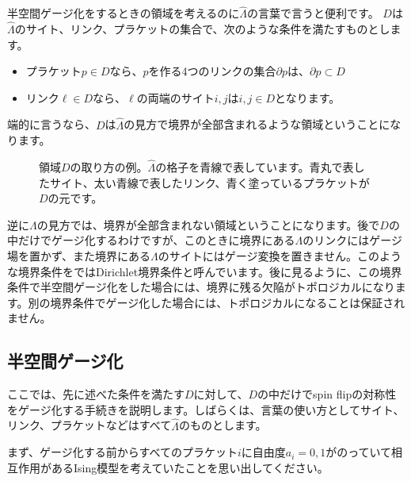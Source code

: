 \documentclass[report,paper=a4, fontsize=12pt, line_length=16cm, number_of_lines=33,dvipdfmx]{jlreq}
\numberwithin{equation}{chapter}
\newcommand{\del}{\partial}
\newcommand{\Lambdah}{\widehat{\Lambda}}
\begin{document}
半空間ゲージ化をするときの領域を考えるのに$\Lambdah$の言葉で言うと便利です。
$D$は$\Lambdah$のサイト、リンク、プラケットの集合で、次のような条件を満たすものとします。
\begin{itemize}
  \item プラケット$p\in D$なら、$p$を作る4つのリンクの集合$\del p$は、$\del p \subset D$
  \item リンク$\ell \in D$なら、$\ell$の両端のサイト$i,j$は$i,j\in D$となります。
\end{itemize}
端的に言うなら、$D$は$\Lambdah$の見方で境界が全部含まれるような領域ということになります。

\begin{figure}
  \centering
\caption{領域$D$の取り方の例。$\Lambdah$の格子を青線で表しています。青丸で表したサイト、太い青線で表したリンク、青く塗っているプラケットが$D$の元です。}
\end{figure}

逆に$\Lambda$の見方では、境界が全部含まれない領域ということになります。後で$D$の中だけでゲージ化するわけですが、このときに境界にある$\Lambda$のリンクにはゲージ場を置かず、また境界にある$\Lambda$のサイトにはゲージ変換を置きません。このような境界条件を\cite{Choi:2021kmx}ではDirichlet境界条件と呼んでいます。後に見るように、この境界条件で半空間ゲージ化をした場合には、境界に残る欠陥がトポロジカルになります。別の境界条件でゲージ化した場合には、トポロジカルになることは保証されません。

\subsection{半空間ゲージ化}\label{sec:halfspacegauging}
ここでは、先に述べた条件を満たす$D$に対して、$D$の中だけでspin flipの対称性をゲージ化する手続きを説明します。しばらくは、言葉の使い方としてサイト、リンク、プラケットなどはすべて$\Lambdah$のものとします。

まず、ゲージ化する前からすべてのプラケット$i$に自由度$a_i=0,1$がのっていて相互作用があるIsing模型を考えていたことを思い出してください。
\end{document}
